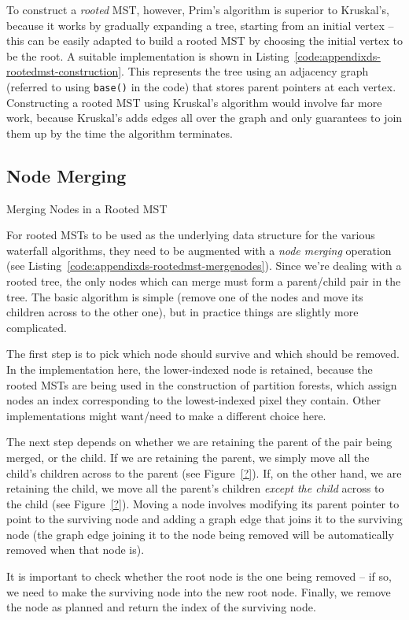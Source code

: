 To construct a \emph{rooted} MST, however, Prim's algorithm is superior to Kruskal's, because it works by gradually expanding a tree, starting from an initial vertex -- this can be easily adapted to build a rooted MST by choosing the initial vertex to be the root. A suitable implementation is shown in Listing~\ref{code:appendixds-rootedmst-construction}. This represents the tree using an adjacency graph (referred to using \texttt{base()} in the code) that stores parent pointers at each vertex. Constructing a rooted MST using Kruskal's algorithm would involve far more work, because Kruskal's adds edges all over the graph and only guarantees to join them up by the time the algorithm terminates.

\afterpage{\clearpage}

\subsection{Node Merging}

\begin{stulisting}[p]
\caption{Merging Nodes in a Rooted MST}
\label{code:appendixds-rootedmst-mergenodes}

\end{stulisting}

For rooted MSTs to be used as the underlying data structure for the various waterfall algorithms, they need to be augmented with a \emph{node merging} operation (see Listing~\ref{code:appendixds-rootedmst-mergenodes}). Since we're dealing with a rooted tree, the only nodes which can merge must form a parent/child pair in the tree. The basic algorithm is simple (remove one of the nodes and move its children across to the other one), but in practice things are slightly more complicated.

The first step is to pick which node should survive and which should be removed. In the implementation here, the lower-indexed node is retained, because the rooted MSTs are being used in the construction of partition forests, which assign nodes an index corresponding to the lowest-indexed pixel they contain. Other implementations might want/need to make a different choice here.

The next step depends on whether we are retaining the parent of the pair being merged, or the child. If we are retaining the parent, we simply move all the child's children across to the parent (see Figure~\ref{?}). If, on the other hand, we are retaining the child, we move all the parent's children \emph{except the child} across to the child (see Figure~\ref{?}). Moving a node involves modifying its parent pointer to point to the surviving node and adding a graph edge that joins it to the surviving node (the graph edge joining it to the node being removed will be automatically removed when that node is).

It is important to check whether the root node is the one being removed -- if so, we need to make the surviving node into the new root node. Finally, we remove the node as planned and return the index of the surviving node.
